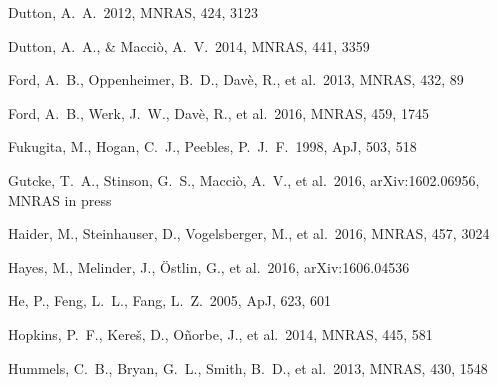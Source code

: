 \documentclass[useAMS,usenatbib]{mn2e}
\def \apj {ApJ}
\def \mnras {MNRAS}
\begin{document}
\begin{thebibliography}{}
 Dutton, A.~A.\ 2012,
  \mnras, 424, 3123
  
 Dutton,
  A.~A., \& Macci{\`o}, A.~V.\ 2014, \mnras, 441, 3359 



    

%
 Ford, A.~B., Oppenheimer, B.~D., Dav{\`e}, R., et al.\ 2013, \mnras, 432, 89

%
 Ford, A.~B., Werk, J.~W., Dav{\`e}, R., et al.\ 2016, \mnras, 459, 1745

 Fukugita, M., Hogan, C.~J., Peebles, P.~J.~F.\ 1998, \apj, 503, 518


 Gutcke, T.~A., Stinson, G.~S., Macci{\`o}, A.~V., et al.\ 2016, arXiv:1602.06956, MNRAS in press



Haider, M., Steinhauser, D., Vogelsberger, M., et al.\ 2016, \mnras, 457, 3024

Hayes, M., Melinder, J., {\"O}stlin, G., et al.\ 2016, arXiv:1606.04536

He, P., Feng, L.~L., Fang, L.~Z.\ 2005, \apj, 623, 601

 Hopkins, P.~F., Kere{\v s}, D., O{\~n}orbe, J., et al.\ 2014, \mnras, 445, 581 

%
 Hummels, C.~B., Bryan, G.~L., Smith, B.~D., et al.\ 2013, \mnras, 430, 1548


\end{thebibliography}
\end{document}
